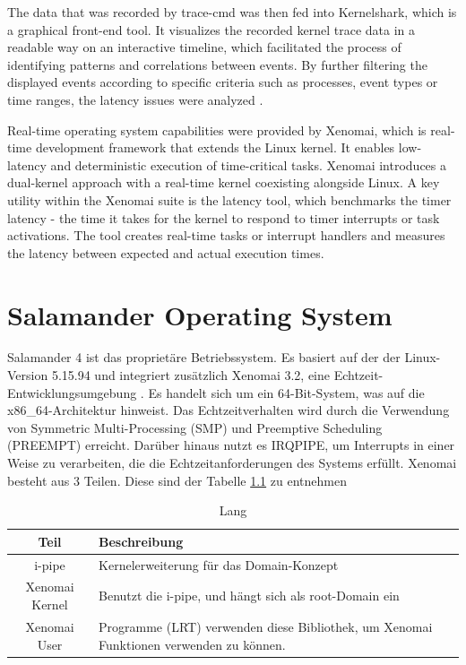 \documentclass[MMR,Master,english]{twbook}
\begin{document}
\bigskip \noindent The data that was recorded by trace-cmd was then fed into Kernelshark, which is a graphical front-end tool. It visualizes the recorded kernel trace data in a readable way on an interactive timeline, which facilitated the process of identifying patterns and correlations between events. By further filtering the displayed events according to specific criteria such as processes, event types or time ranges, the latency issues were analyzed \cite{KernelShark}. 

\bigskip \noindent Real-time operating system capabilities were provided by Xenomai, which is real-time development framework that extends the Linux kernel. It enables low-latency and deterministic execution of time-critical tasks. Xenomai introduces a dual-kernel approach with a real-time kernel coexisting alongside Linux. A key utility within the Xenomai suite is the latency tool, which benchmarks the timer latency - the time it takes for the kernel to respond to timer interrupts or task activations. The tool creates real-time tasks or interrupt handlers and measures the latency between expected and actual execution times\cite{Xenomai}.


\clearpage 
\chapter{Salamander Operating System}
Salamander 4 ist das proprietäre Betriebssystem.
Es basiert auf der der Linux-Version 5.15.94 und integriert zusätzlich Xenomai 3.2, eine Echtzeit-Entwicklungsumgebung \cite{Xenomai}. Es handelt sich um ein 64-Bit-System, was auf die x86\_64-Architektur hinweist. Das Echtzeitverhalten wird durch die Verwendung von Symmetric Multi-Processing (SMP) und Preemptive Scheduling (PREEMPT) erreicht. Darüber hinaus nutzt es IRQPIPE, um Interrupts in einer Weise zu verarbeiten, die die Echtzeitanforderungen des Systems erfüllt. Xenomai besteht aus 3 Teilen. Diese sind der Tabelle \ref{tab:what_is_xenomai} zu entnehmen 

\begin{table}[!h]
    \centering
    \caption[Kurz]{Lang}
    \label{tab:what_is_xenomai}
    \setlength{\tabcolsep}{0.5em} %
    {\renewcommand{\arraystretch}{1.2}%
    \begin{tabular}{|c|p{}|}
        \hline
        \textbf{Teil} & \textbf{Beschreibung} \\ \hline
        i-pipe  & Kernelerweiterung für das Domain-Konzept \\ \hline
        Xenomai Kernel & Benutzt die i-pipe, und hängt sich als root-Domain ein \\ \hline
        Xenomai User &  Programme (LRT) verwenden diese Bibliothek, um Xenomai Funktionen verwenden zu können. \\ \hline
    \end{tabular}}
  \end{table}
  
\end{document}
